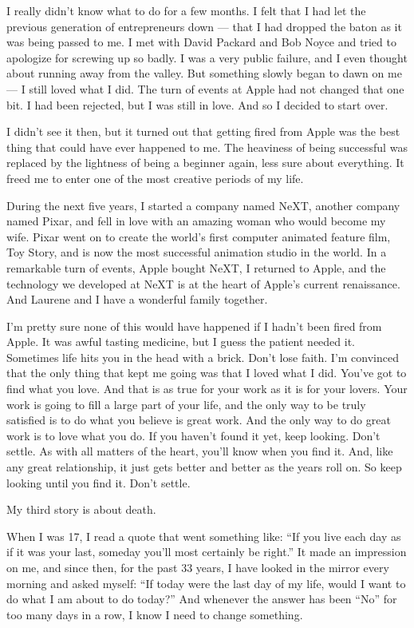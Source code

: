 \documentclass{ltjsarticle}
\begin{document}
I really didn’t know what to do for a few months. I felt that I had let the previous generation of entrepreneurs down — that I had dropped the baton as it was being passed to me. I met with David Packard and Bob Noyce and tried to apologize for screwing up so badly. I was a very public failure, and I even thought about running away from the valley. But something slowly began to dawn on me — I still loved what I did. The turn of events at Apple had not changed that one bit. I had been rejected, but I was still in love. And so I decided to start over.

I didn’t see it then, but it turned out that getting fired from Apple was the best thing that could have ever happened to me. The heaviness of being successful was replaced by the lightness of being a beginner again, less sure about everything. It freed me to enter one of the most creative periods of my life.

During the next five years, I started a company named NeXT, another company named Pixar, and fell in love with an amazing woman who would become my wife. Pixar went on to create the world’s first computer animated feature film, Toy Story, and is now the most successful animation studio in the world. In a remarkable turn of events, Apple bought NeXT, I returned to Apple, and the technology we developed at NeXT is at the heart of Apple’s current renaissance. And Laurene and I have a wonderful family together.

I’m pretty sure none of this would have happened if I hadn’t been fired from Apple. It was awful tasting medicine, but I guess the patient needed it. Sometimes life hits you in the head with a brick. Don’t lose faith. I’m convinced that the only thing that kept me going was that I loved what I did. You’ve got to find what you love. And that is as true for your work as it is for your lovers. Your work is going to fill a large part of your life, and the only way to be truly satisfied is to do what you believe is great work. And the only way to do great work is to love what you do. If you haven’t found it yet, keep looking. Don’t settle. As with all matters of the heart, you’ll know when you find it. And, like any great relationship, it just gets better and better as the years roll on. So keep looking until you find it. Don’t settle.

My third story is about death.

When I was 17, I read a quote that went something like: “If you live each day as if it was your last, someday you’ll most certainly be right.” It made an impression on me, and since then, for the past 33 years, I have looked in the mirror every morning and asked myself: “If today were the last day of my life, would I want to do what I am about to do today?” And whenever the answer has been “No” for too many days in a row, I know I need to change something.
\end{document}
